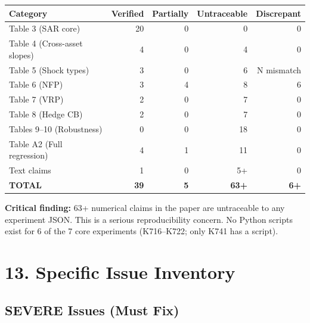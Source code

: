 \documentclass[12pt,a4paper]{article}
\begin{document}
\begin{tabular}{lrrrr}
\toprule
Category & Verified & Partially & Untraceable & Discrepant \\
\midrule
Table 3 (SAR core)             & 20 & 0 &  0 & 0 \\
Table 4 (Cross-asset slopes)   &  4 & 0 &  4 & 0 \\
Table 5 (Shock types)          &  3 & 0 &  6 & N mismatch \\
Table 6 (NFP)                  &  3 & 4 &  8 & 6 \\
Table 7 (VRP)                  &  2 & 0 &  7 & 0 \\
Table 8 (Hedge CB)             &  2 & 0 &  7 & 0 \\
Tables 9--10 (Robustness)      &  0 & 0 & 18 & 0 \\
Table A2 (Full regression)     &  4 & 1 & 11 & 0 \\
Text claims                    &  1 & 0 &  5+ & 0 \\
\midrule
\textbf{TOTAL}                 & \textbf{39} & \textbf{5} & \textbf{63+} & \textbf{6+} \\
\bottomrule
\end{tabular}

\bigskip

\noindent\textbf{Critical finding:} 63+ numerical claims in the paper are untraceable to any experiment JSON.  This is a serious reproducibility concern.  No Python scripts exist for 6 of the 7 core experiments (K716--K722; only K741 has a script).

\section*{13. Specific Issue Inventory}

\subsection*{\textcolor{errorred}{SEVERE Issues (Must Fix)}}
\end{document}

